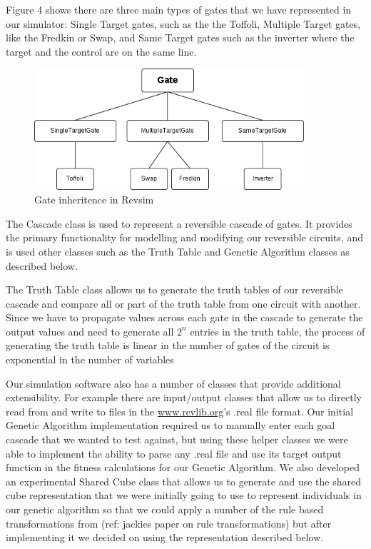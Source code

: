 Figure 4 shows there are three main types of gates that we have represented in our simulator: Single Target 
gates, such as the the Toffoli, Multiple Target gates, like the Fredkin or Swap, and Same Target gates such as the inverter 
where the target and the control are on the same line.

\begin{figure}[ht!]
\centering
\includegraphics[width=100mm]{diagrams/gate_inheritence.png}
\caption{Gate inheritence in Revsim}
\label{overflow}
\end{figure}
The Cascade class is used to represent a reversible cascade of gates. It provides the primary functionality for modelling 
and modifying our reversible circuits, and is used other classes such as the Truth Table and Genetic Algorithm classes as 
described below.

The Truth Table class allows us to generate the truth tables of our reversible cascade and compare all or part of the truth 
table from one circuit with another. Since we have to propagate values across each gate in the cascade to generate the output 
values and need to generate all \(2^{n}\) entries in the truth table, the process of generating the truth table is linear in the 
number of gates of the circuit is exponential in the number of variables 

Our simulation software also has a number of classes that provide additional extensibility. For example there are input/output 
classes that allow us to directly read from and write to files in the \url{www.revlib.org}'s .real file format. Our initial Genetic Algorithm implementation 
required us to manually enter each goal cascade that we wanted to test against, but using these helper classes we were able to 
implement the ability to parse any .real file and use its target output function in the fitness calculations for our Genetic 
Algorithm. We also developed an experimental Shared Cube class that allows us to generate and use the shared cube 
representation that we were initially going to use to represent individuals in our genetic algorithm so that we could apply a 
number of the rule based transformations from (ref: jackies paper on rule transformations) but after implementing it we decided 
on using the representation described below. 

